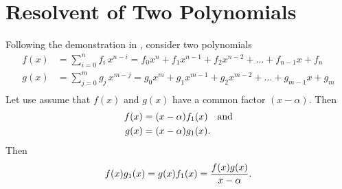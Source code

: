 \section{Resolvent of Two Polynomials}

Following the demonstration in \cite{Dehn}, consider two polynomials 
\begin{align*}
f(x)  &= \sum_{i=0}^n f_i\,x^{n-i} = f_0 x^n + f_1 x^{n-1} + f_2 x^{n-2} + \hdots + f_{n-1} x + f_n\\
g(x) &=  \sum_{j=0}^m g_j\,x^{m-j} = g_0 x^m + g_1 x^{m-1} + g_2 x^{m-2} + \hdots + g_{m-1} x + g_m\\
\end{align*}
Let use assume that $f(x)$ and $g(x)$ have a common factor $(x-\alpha)$. Then 
\begin{align*} f(x) &= (x-\alpha) f_1(x) \quad \hbox{and} \\
                     g(x) & = (x-\alpha) g_1(x).\end{align*}
Then $$f(x) g_1(x) = g(x) f_1(x) = {f(x) g(x) \over x-\alpha}.$$
 
